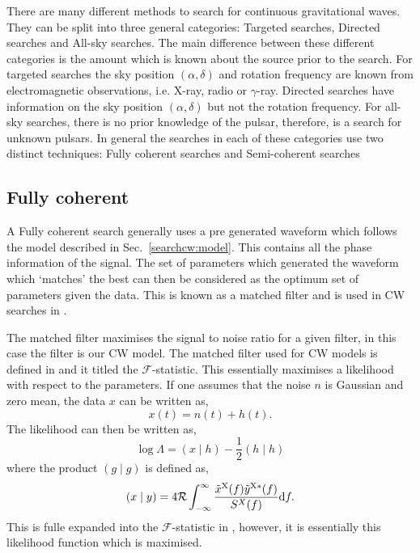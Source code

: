 There are many different methods to search for continuous gravitational waves.
They can be split into three general categories: Targeted searches, Directed searches and All-sky searches.
The main difference between these different categories is the amount which is known about the source prior to the search.
For targeted searches the sky position $(\alpha,\delta)$ and rotation frequency are known from electromagnetic observations, i.e. X-ray, radio or $\gamma$-ray.
Directed searches have information on the sky position $(\alpha,\delta)$ but not the rotation frequency.
For all-sky searches, there is no prior knowledge of the pulsar, therefore, is a search for unknown pulsars.
In general the searches in each of these categories use two distinct techniques: Fully coherent searches and Semi-coherent searches

\subsection{\label{searchcw:search:coherent}Fully coherent}

A Fully coherent search generally uses a pre generated waveform which follows the model described in Sec.~\ref{searchcw:model}. 
This contains all the phase information of the signal.
The set of parameters which generated the waveform which `matches' the best can then be considered as the optimum set of parameters given the data.
This is known as a matched filter \citep{} and is used in \ac{CW} searches in \citep{dupuis2005BayesianEstimation,}.

The matched filter maximises the signal to noise ratio for a given filter, in this case the filter is our \ac{CW} model. 
The matched filter used for \ac{CW} models is defined in \citep{prix2007SearchContinuous} and it titled the $\mathcal{F}$-statistic. 
This essentially maximises a likelihood with respect to the parameters.
If one assumes that the noise $n$ is Gaussian and zero mean, the data $x$ can be written as,
\begin{equation}
		x(t) = n(t) + h(t).
\end{equation}
The likelihood can then be written as,
\begin{equation}
		\log \Lambda = \left( x \mid h \right) - \frac{1}{2} \left( h \mid h\right) 
\end{equation}
where the product $(g \mid g)$ is defined as,
\begin{equation}
		\left( x \mid y \right) = 4 \mathcal{R} \int^{\infty}_{-\infty}  \frac{\tilde{x}^{{\rm X}}(f) \tilde{y}^{{\rm X *}}(f)  }{S^{X}(f)} \mathrm{d}f.
\end{equation}
This is fulle expanded into the $\mathcal{F}$-statistic in \citep{schutz1998DataAnalysis}, however, it is essentially this likelihood function which is maximised. 


